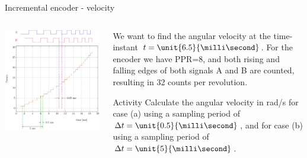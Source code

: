 \documentclass[presentation,aspectratio=169]{beamer}
\begin{document}
\begin{frame}[label={sec:org671af85}]{Incremental encoder - velocity}
\begin{columns}
\begin{column}{0.5\columnwidth}
\begin{center}
\includegraphics[width=\textwidth]{../../figures/encoder-signals-nonuniform}
\end{center}
\end{column}
\begin{column}{0.5\columnwidth}
We want to find the angular velocity at the time-instant \(t=\unit{6.5}{\milli\second}\). For the encoder we have PPR=8, and both rising and falling edges of both signals A and B are counted, resulting in 32 counts per revolution.

\alert{Activity} Calculate the angular velocity in rad/s for case \alert{(a)} using a sampling period of \(\Delta t=\unit{0.5}{\milli\second}\), and for case \alert{(b)} using a sampling period of \(\Delta t=\unit{5}{\milli\second}\).
\end{column}
\end{columns}
\end{frame}
\end{document}
